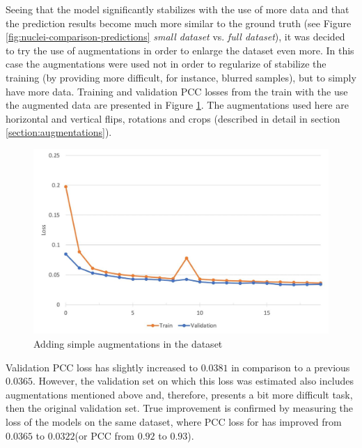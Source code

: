 Seeing that the model significantly stabilizes with the use of more data and that the prediction results become much more similar to the ground truth (see Figure \ref{fig:nuclei-comparison-predictions} \textit{small dataset} vs. \textit{full dataset}), it was decided to try the use of augmentations in order to enlarge the dataset even more. In this case the augmentations were used not in order to regularize of stabilize the training (by providing more difficult, for instance, blurred samples), but to simply have more data. Training and validation PCC losses from the train with the use the augmented data are presented in Figure \ref{fig:no-reg-augmented}. The augmentations used here are horizontal and vertical flips, rotations and crops (described in detail in section \ref{section:augmentations}). 
\begin{figure}[H]
	\begin{center}
		\includegraphics[width=0.5\linewidth]{bilder/nuclei/no-reg-but-aug.jpg}
		\caption{Adding simple augmentations in the dataset}\label{fig:no-reg-augmented}
	\end{center}
\end{figure}
Validation PCC loss has slightly increased to $0.0381$ in comparison to a previous $0.0365$. However, the validation set on which this loss was estimated also includes augmentations mentioned above and, therefore, presents a bit more difficult task, then the original validation set. True improvement is confirmed by measuring the loss of the models on the same dataset, where PCC loss for has improved from $0.0365$ to $0.0322$(or PCC from $0.92$ to $0.93$).

